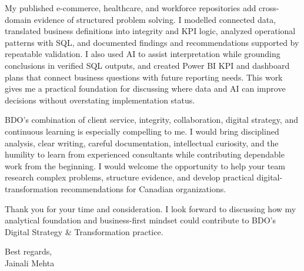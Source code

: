 \documentclass[letterpaper,11pt]{article}
\begin{document}
\bigbreak
My published e-commerce, healthcare, and workforce repositories add cross-domain evidence of structured problem solving. I modelled connected data, translated business definitions into integrity and KPI logic, analyzed operational patterns with SQL, and documented findings and recommendations supported by repeatable validation. I also used AI to assist interpretation while grounding conclusions in verified SQL outputs, and created Power BI KPI and dashboard plans that connect business questions with future reporting needs. This work gives me a practical foundation for discussing where data and AI can improve decisions without overstating implementation status.

\bigbreak
BDO's combination of client service, integrity, collaboration, digital strategy, and continuous learning is especially compelling to me. I would bring disciplined analysis, clear writing, careful documentation, intellectual curiosity, and the humility to learn from experienced consultants while contributing dependable work from the beginning. I would welcome the opportunity to help your team research complex problems, structure evidence, and develop practical digital-transformation recommendations for Canadian organizations.

\bigbreak
Thank you for your time and consideration. I look forward to discussing how my analytical foundation and business-first mindset could contribute to BDO's Digital Strategy \& Transformation practice.

\bigbreak
Best regards,\\
Jainali Mehta
\end{document}
